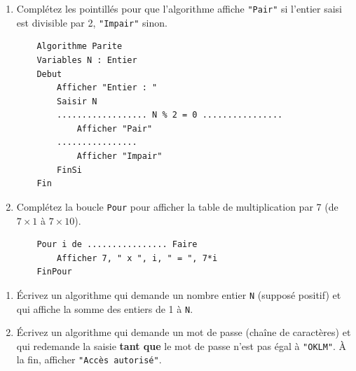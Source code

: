 \documentclass[11pt]{article}
\begin{document}
\begin{exercice}
\begin{enumerate}
    \item Complétez les pointillés pour que l'algorithme affiche \texttt{"Pair"} si l'entier saisi est divisible par 2, \texttt{"Impair"} sinon.
    \begin{verbatim}
    Algorithme Parite
    Variables N : Entier
    Debut
        Afficher "Entier : "
        Saisir N
        .................. N % 2 = 0 ................
            Afficher "Pair"
        ................
            Afficher "Impair"
        FinSi
    Fin
    \end{verbatim}
    \item Complétez la boucle \texttt{Pour} pour afficher la table de multiplication par 7 (de $7\times1$ à $7\times10$).
    \begin{verbatim}
    Pour i de ................ Faire
        Afficher 7, " x ", i, " = ", 7*i
    FinPour
    \end{verbatim}
\end{enumerate}
\end{exercice}

\begin{exercice}
\begin{enumerate}
    \item Écrivez un algorithme qui demande un nombre entier \texttt{N} (supposé positif) et qui affiche la somme des entiers de 1 à \texttt{N}.
    \item Écrivez un algorithme qui demande un mot de passe (chaîne de caractères) et qui redemande la saisie \textbf{tant que} le mot de passe n'est pas égal à \texttt{"OKLM"}. À la fin, afficher \texttt{"Accès autorisé"}.
\end{enumerate}
\end{exercice}
\end{document}
